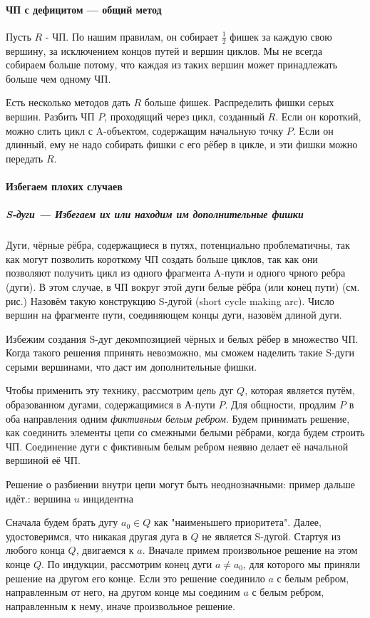 \paragraph{ЧП с дефицитом --- общий метод}
Пусть $R$ - ЧП. По нашим правилам, он собирает $\frac{1}{2}$ фишек за каждую свою вершину, за исключением концов путей и вершин циклов. Мы не всегда собираем больше потому, что каждая из таких вершин может принадлежать больше чем одному ЧП.

Есть несколько методов дать $R$ больше фишек.
Распределить фишки серых вершин.
Разбить ЧП $P$, проходящий через цикл, созданный $R$. Если он короткий, можно слить цикл с A-объектом, содержащим начальную точку $P$. Если он длинный, ему не надо собирать фишки с его рёбер в цикле, и эти фишки можно передать $R$.

\paragraph{Избегаем плохих случаев}
\subparagraph{S-дуги --- Избегаем их или находим им дополнительные фишки}

Дуги, чёрные рёбра, содержащиеся в путях, потенциально проблематичны, так как могут позволить короткому ЧП создать больше циклов, так как они позволяют получить цикл из одного фрагмента A-пути и одного чрного ребра (дуги). В этом случае, в ЧП вокруг этой дуги белые рёбра (или конец пути) (см. рис.) Назовём такую конструкцию S-дугой (short cycle making arc). Число вершин на фрагменте пути, соединяющем концы дуги, назовём длиной дуги.

Избежим создания S-дуг декомпозицией чёрных и белых рёбер в множество ЧП. Когда такого решения ппринять невозможно, мы сможем наделить такие S-дуги серыми вершинами, что даст им дополнительные фишки. 

Чтобы применить эту технику, рассмотрим \textit{цепь} дуг $Q$, которая является путём, образованном дугами, содержащимися в А-пути $P$. Для общности, продлим $P$ в оба направления одним \textit{фиктивным белым ребром}. Будем принимать решение, как соединить элементы цепи со смежными белыми рёбрами, когда будем строить ЧП. Соединение дуги с фиктивным белым ребром неявно делает её начальной вершиной её ЧП.

Решение о разбиении внутри цепи могут быть неоднозначными: пример дальше идёт.: вершина $u$ инцидентна 

Сначала будем брать дугу $a_0 \in Q$ как "наименьшего приоритета". Далее, удостоверимся, что никакая другая дуга в $Q$ не является S-дугой. Стартуя из любого конца $Q$, двигаемся к $a$. Вначале примем произвольное решение на этом конце $Q$. По индукции, рассмотрим конец дуги $a \ne a_0$, для которого мы приняли решение на другом его конце. Если это решение соединило $a$ с белым ребром, направленным от него, на другом конце мы соединим $a$ с белым ребром, направленным к нему, иначе произвольное решение.

